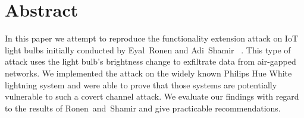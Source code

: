 \section*{Abstract}

In this paper we attempt to reproduce the functionality extension attack on IoT light bulbs initially conducted by Eyal~Ronen and Adi~Shamir~\cite{Ronen:2016:EFAIDCSL} . This type of attack uses the light bulb's brightness change to exfiltrate data from air-gapped networks. We implemented the attack on the widely known Philips Hue White lightning system and were able to prove that those systems are potentially vulnerable to such a covert channel attack. We evaluate our findings with regard to the results of Ronen~and~Shamir and give practicable recommendations. 
